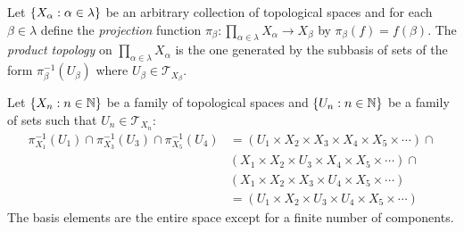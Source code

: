 \documentclass[letterpaper,12pt,fleqn]{article}
\newcommand{\p}{\pi}
\newcommand{\T}{\mathscr{T}}
\renewcommand{\a}{\alpha}
\renewcommand{\b}{\beta}
\renewcommand{\l}{\lambda}
\begin{document}
\begin{definition}
  Let \(\set{X_{\a}:\a\in\l}\) be an arbitrary collection of topological spaces and for each \(\b\in\l\) define the
  \emph{projection} function \(\p_{\b}:\prod_{\a\in\l}X_{\a}\to X_{\b}\) by \(\p_{\b}(f)=f(\b)\).  The
  \emph{product topology} on \(\prod_{\a\in\l}X_{\a}\) is the one generated by the subbasis of sets of the form
  \(\p_{\b}^{-1}(U_{\b})\) where \(U_{\b}\in\T_{X_{\b}}\).
\end{definition}

\begin{example}
  Let \(\{X_n:n\in\mathbb{N}\}\) be a family of topological spaces and \(\{U_n:n\in\mathbb{N}\}\) be a family of sets such that
  \(U_n\in\T_{X_n}\):
  \begin{align*}
    \p_{X_1}^{-1}(U_1)\cap\p_{X_3}^{-1}(U_3)\cap\p_{X_5}^{-1}(U_4) &=
    (U_1\times X_2\times X_3\times X_4\times X_5\times\cdots)\cap \\
    & (X_1\times X_2\times U_3\times X_4\times X_5\times\cdots)\cap \\
    & (X_1\times X_2\times X_3\times U_4\times X_5\times\cdots) \\
    &= (U_1\times X_2\times U_3\times U_4\times X_5\times\cdots)
  \end{align*}
  The basis elements are the entire space except for a finite number of components.
\end{example}
\end{document}

